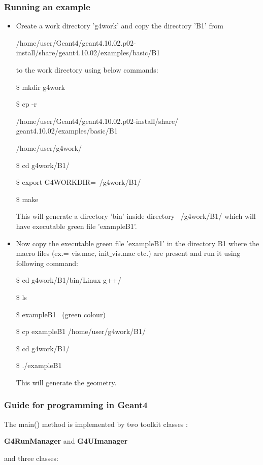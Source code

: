 \subsubsection{Running an example}
\begin{itemize}
	\item Create a work directory 'g4work' and copy the directory 'B1' from
	
	/home/user/Geant4/geant4.10.02.p02-install/share/geant4.10.02/examples/basic/B1 
	
	to the work directory using below commands:
	
	$\$$ mkdir g4work
	
	$\$$ cp -r 
	
	/home/user/Geant4/geant4.10.02.p02-install/share/ \,  geant4.10.02/examples/basic/B1  
	
	/home/user/g4work/
	
	$\$$ cd g4work/B1/
	
	$\$$ export G4WORKDIR=~/g4work/B1/
	
	$\$$ make
	
	This will generate a directory 'bin' inside directory ~/g4work/B1/ which will have executable green file 'exampleB1'.
	
	\item Now copy the executable green file 'exampleB1' in the directory B1 where the macro files (ex.= vis.mac, init$\_$vis.mac etc.) are present and run it using following command:
	
	$\$$ cd  g4work/B1/bin/Linux-g++/
	
	$\$$ ls
	
	$\$$ exampleB1   \,    (green colour)
	
	$\$$ cp exampleB1 /home/user/g4work/B1/
	
	$\$$ cd  g4work/B1/
	
	$\$$ ./exampleB1
	
	This will generate the geometry.
	 
\end{itemize}

\subsubsection{Guide for programming in Geant4}
The main() method is implemented by two toolkit classes \cite{geant4}:

\textbf{G4RunManager} and \textbf{G4UImanager} 

and three classes:

